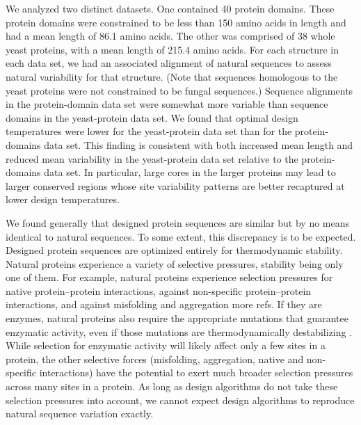 \documentclass[12pt]{article}
\begin{document}
We analyzed two distinct datasets. One contained 40 protein domains. These protein domains were constrained to be less than 150 amino acids in length and had a mean length of 86.1 amino acids. The other was comprised of 38 whole yeast proteins, with a mean length of 215.4 amino acids. For each structure in each data set, we had an associated alignment of natural sequences to assess natural variability for that structure. (Note that sequences homologous to the yeast proteins were not constrained to be fungal sequences.) Sequence alignments in the protein-domain data set were somewhat more variable than sequence domains in the yeast-protein data set. We found that optimal design temperatures were lower for the yeast-protein data set than for the protein-domains data set. This finding is consistent with both increased mean length and reduced mean variability in the yeast-protein data set relative to the protein-domains data set. In particular, large cores in the larger proteins may lead to larger conserved regions whose site variability patterns are better recaptured at lower design temperatures. 

We found generally that designed protein sequences are similar but by no means identical to natural sequences. To some extent, this discrepancy is to be expected. Designed protein sequences are optimized entirely for thermodynamic stability. Natural proteins experience a variety of selective pressures, stability being only one of them. For example, natural proteins experience selection pressures for native protein--protein interactions, against non-specific protein--protein interactions, and against misfolding and aggregation  \citep{Fraser2002, Zarrinpar2003, Drummond2008}{\color{red}more refs}. If they are enzymes, natural proteins also require the appropriate mutations that guarantee enzymatic activity, even if those mutations are thermodynamically destabilizing \citep{Bloometal2006}. While selection for enzymatic activity will likely affect only a few sites in a protein, the other selective forces (misfolding, aggregation, native and non-specific interactions) have the potential to exert much broader selection pressures across many sites in a protein. As long as design algorithms do not take these selection pressures into account, we cannot expect design algorithms to reproduce natural sequence variation exactly.
\end{document}
